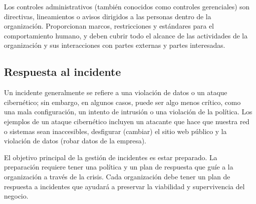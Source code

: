 Los controles administrativos (también conocidos como controles gerenciales) son directivas, lineamientos o avisos dirigidos a las personas dentro de la organización. Proporcionan marcos, restricciones y estándares para el comportamiento humano, y deben cubrir todo el alcance de las actividades de la organización y sus interacciones con partes externas y partes interesadas.




\subsection{Respuesta al incidente}
Un incidente generalmente se refiere a una violación de datos o un ataque cibernético; sin embargo, en algunos casos, puede ser algo menos crítico, como una mala configuración, un intento de intrusión o una violación de la política. Los ejemplos de un ataque cibernético incluyen un atacante que hace que nuestra red o sistemas sean inaccesibles, desfigurar (cambiar) el sitio web público y la violación de datos (robar datos de la empresa). 


El objetivo principal de la gestión de incidentes es estar preparado. La preparación requiere tener una política y un plan de respuesta que guíe a la organización a través de la crisis. Cada organización debe tener un plan de respuesta a incidentes que ayudará a preservar la viabilidad y supervivencia del negocio.

